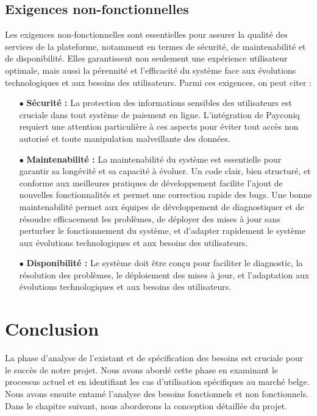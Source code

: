 \subsection{Exigences non-fonctionnelles}

Les exigences non-fonctionnelles sont essentielles pour assurer la qualité des services de la plateforme, notamment en termes de sécurité, de maintenabilité et de disponibilité. Elles garantissent non seulement une expérience utilisateur optimale, mais aussi la pérennité et l'efficacité du système face aux évolutions technologiques et aux besoins des utilisateurs. Parmi ces exigences, on peut citer :

\begin{itemize}
    \item [$\bullet$]\textbf{Sécurité :} La protection des informations sensibles des utilisateurs est cruciale dans tout système de paiement en ligne. L'intégration de Payconiq requiert une attention particulière à ces aspects pour éviter tout accès non autorisé et toute manipulation malveillante des données.
    \item [$\bullet$]\textbf{Maintenabilité :} La maintenabilité du système est essentielle pour garantir sa longévité et sa capacité à évoluer. Un code clair, bien structuré, et conforme aux meilleures pratiques de développement facilite l'ajout de nouvelles fonctionnalités et permet une correction rapide des bugs. Une bonne maintenabilité permet aux équipes de développement de diagnostiquer et de résoudre efficacement les problèmes, de déployer des mises à jour sans perturber le fonctionnement du système, et d'adapter rapidement le système aux évolutions technologiques et aux besoins des utilisateurs.
    \item [$\bullet$]\textbf{Disponibilité :} Le système doit être conçu pour faciliter le diagnostic, la résolution des problèmes, le déploiement des mises à jour, et l’adaptation aux évolutions technologiques et aux besoins des utilisateurs.
\end{itemize}


\section*{Conclusion}
La phase d'analyse de l'existant et de spécification des besoins est cruciale pour le succès de notre projet. Nous avons abordé cette phase en examinant le processus actuel et en identifiant les cas d'utilisation spécifiques au marché belge. Nous avons ensuite entamé l'analyse des besoins fonctionnels et non fonctionnels. Dans le chapitre suivant, nous aborderons la conception détaillée du projet.